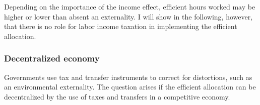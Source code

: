 Depending on the importance of the income effect, efficient hours worked may be higher or lower than  absent an externality. I will show in the following, however, that there is no role for labor income taxation in implementing the efficient allocation. %


\subsubsection{Decentralized economy}\label{subsec:decen_ec}

Governments use tax and transfer instruments to correct for distortions, such as an environmental externality. The question arises if the efficient allocation can be decentralized by the use of taxes and transfers in a competitive economy.  %



